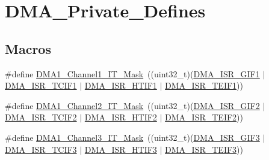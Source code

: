 \hypertarget{group___d_m_a___private___defines}{}\section{D\+M\+A\+\_\+\+Private\+\_\+\+Defines}
\label{group___d_m_a___private___defines}
\subsection*{Macros}
\begin{DoxyCompactItemize}
\item 
\#define \mbox{\hyperlink{group___d_m_a___private___defines_ga76177263f2b9878765606f3bb8b9cc64}{D\+M\+A1\+\_\+\+Channel1\+\_\+\+I\+T\+\_\+\+Mask}}~((uint32\+\_\+t)(\mbox{\hyperlink{group___peripheral___registers___bits___definition_ga3475228c998897d0f408a4c5da066186}{D\+M\+A\+\_\+\+I\+S\+R\+\_\+\+G\+I\+F1}} $\vert$ \mbox{\hyperlink{group___peripheral___registers___bits___definition_ga1a1522414af27c7fff2cc27edac1d680}{D\+M\+A\+\_\+\+I\+S\+R\+\_\+\+T\+C\+I\+F1}} $\vert$ \mbox{\hyperlink{group___peripheral___registers___bits___definition_ga5f83359698adf05854b55705f78d8a5c}{D\+M\+A\+\_\+\+I\+S\+R\+\_\+\+H\+T\+I\+F1}} $\vert$ \mbox{\hyperlink{group___peripheral___registers___bits___definition_ga26bfd55e965445ae253a5c5fa8f1769a}{D\+M\+A\+\_\+\+I\+S\+R\+\_\+\+T\+E\+I\+F1}}))
\item 
\#define \mbox{\hyperlink{group___d_m_a___private___defines_ga255d8869e69919c3b5c434088239ae8c}{D\+M\+A1\+\_\+\+Channel2\+\_\+\+I\+T\+\_\+\+Mask}}~((uint32\+\_\+t)(\mbox{\hyperlink{group___peripheral___registers___bits___definition_ga44fa823dbb15b829621961efc60d6a95}{D\+M\+A\+\_\+\+I\+S\+R\+\_\+\+G\+I\+F2}} $\vert$ \mbox{\hyperlink{group___peripheral___registers___bits___definition_ga631741eb4843eda3578808a3d8b527b2}{D\+M\+A\+\_\+\+I\+S\+R\+\_\+\+T\+C\+I\+F2}} $\vert$ \mbox{\hyperlink{group___peripheral___registers___bits___definition_ga8ee1947aef188f437f37d3ff444f8646}{D\+M\+A\+\_\+\+I\+S\+R\+\_\+\+H\+T\+I\+F2}} $\vert$ \mbox{\hyperlink{group___peripheral___registers___bits___definition_ga5bcd07efcadd5fef598edec1cca70e38}{D\+M\+A\+\_\+\+I\+S\+R\+\_\+\+T\+E\+I\+F2}}))
\item 
\#define \mbox{\hyperlink{group___d_m_a___private___defines_gabbe4f28c48dc0c3b678cbf4a4fd79e54}{D\+M\+A1\+\_\+\+Channel3\+\_\+\+I\+T\+\_\+\+Mask}}~((uint32\+\_\+t)(\mbox{\hyperlink{group___peripheral___registers___bits___definition_gacb0bd8fb0e580688c5cf617b618bbc17}{D\+M\+A\+\_\+\+I\+S\+R\+\_\+\+G\+I\+F3}} $\vert$ \mbox{\hyperlink{group___peripheral___registers___bits___definition_ga28664595df654d9d8052fb6f9cc48495}{D\+M\+A\+\_\+\+I\+S\+R\+\_\+\+T\+C\+I\+F3}} $\vert$ \mbox{\hyperlink{group___peripheral___registers___bits___definition_ga53bb9a00737c52faffaaa91ff08b34a1}{D\+M\+A\+\_\+\+I\+S\+R\+\_\+\+H\+T\+I\+F3}} $\vert$ \mbox{\hyperlink{group___peripheral___registers___bits___definition_gaa624379143a2535d7a60d87d59834d10}{D\+M\+A\+\_\+\+I\+S\+R\+\_\+\+T\+E\+I\+F3}}))

\end{DoxyCompactItemize}
